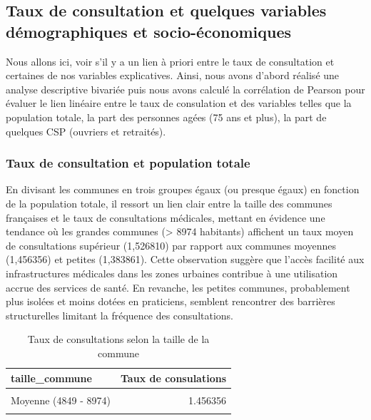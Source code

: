 \documentclass[
]{article}
\begin{document}
\subsection{Taux de consultation et quelques variables démographiques et
socio-économiques}\label{taux-de-consultation-et-quelques-variables-duxe9mographiques-et-socio-uxe9conomiques}

Nous allons ici, voir s'il y a un lien à priori entre le taux de
consultation et certaines de nos variables explicatives. Ainsi, nous
avons d'abord réalisé une analyse descriptive bivariée puis nous avons
calculé la corrélation de Pearson pour évaluer le lien linéaire entre le
taux de consulation et des variables telles que la population totale, la
part des personnes agées (75 ans et plus), la part de quelques CSP
(ouvriers et retraités).

\subsubsection{Taux de consultation et population
totale}\label{taux-de-consultation-et-population-totale}

En divisant les communes en trois groupes égaux (ou presque égaux) en
fonction de la population totale, il ressort un lien clair entre la
taille des communes françaises et le taux de consultations médicales,
mettant en évidence une tendance où les grandes communes (\textgreater{}
8974 habitants) affichent un taux moyen de consultations supérieur
(1,526810) par rapport aux communes moyennes (1,456356) et petites
(1,383861). Cette observation suggère que l'accès facilité aux
infrastructures médicales dans les zones urbaines contribue à une
utilisation accrue des services de santé. En revanche, les petites
communes, probablement plus isolées et moins dotées en praticiens,
semblent rencontrer des barrières structurelles limitant la fréquence
des consultations.

\begin{table}[H]
\centering
\caption{\label{tab:unnamed-chunk-8}Taux de consultations selon la taille de la commune}
\centering
\begin{tabular}[t]{lr}
\toprule
taille\_commune & Taux de consulations\\
\midrule
\cellcolor{gray!10}{Grande (> 8974)} & \cellcolor{gray!10}{1.526810}\\
Moyenne (4849 - 8974) & 1.456356\\
\cellcolor{gray!10}{Petite (<= 4848)} & \cellcolor{gray!10}{1.383861}\\
\bottomrule
\end{tabular}
\end{table}
\end{document}
